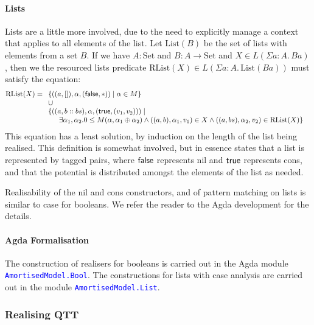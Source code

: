 \documentclass[acmsmall,review,screen,anonymous]{acmart}
\newcommand{\Set}{\mathrm{Set}}
\newcommand{\AgdaModule}[1]{\textcolor{blue}{\tt #1}}
\begin{document}
\paragraph{Lists} Lists are a little more involved, due to the need to
explicitly manage a context that applies to all elements of the
list. Let $\mathrm{List}(B)$ be the set of lists with elements from a
set $B$. If we have $A : \Set$ and $B : A \to \Set$ and
$X \in L(\Sigma a:A.\, B a)$, then we the resourced lists predicate
$\mathrm{RList}(X) \in L(\Sigma a : A.\, \mathrm{List}(B a))$ must
satisfy the equation:
\begin{displaymath}
  \mathrm{RList}(X) =
  \begin{array}[t]{l}
    \{ ((a, []), \alpha, (\synFalse, *)) \mid \alpha \in M \} \\
    \cup \\
    \{ \begin{array}[t]{@{}l}
         ((a, b :: bs), \alpha, (\synTrue, (v_1, v_2))) \mid \\
         \quad \exists \alpha_1, \alpha_2. 0 \leq M(\alpha, \alpha_1 \oplus \alpha_2) \land ((a, b), \alpha_1, v_1) \in X \land ((a, bs), \alpha_2, v_2) \in \mathrm{RList}(X) \}
       \end{array}
  \end{array}
\end{displaymath}
This equation has a least solution, by induction on the length of the
list being realised. This definition is somewhat involved, but in
essence states that a list is represented by tagged pairs, where
$\mathsf{false}$ represents nil and $\mathsf{true}$ represents cons, and that
the potential is distributed amongst the elements of the list as
needed.

Realisability of the nil and cons constructors, and of pattern
matching on lists is similar to case for booleans. We refer the reader
to the Agda development for the details.

\paragraph{Agda Formalisation} The construction of realisers for
booleans is carried out in the Agda module
\AgdaModule{AmortisedModel.Bool}. The constructions for lists with
case analysis are carried out in the module
\AgdaModule{AmortisedModel.List}.

\subsubsection{Realising QTT}
\end{document}

